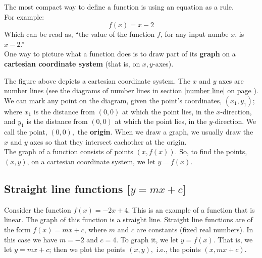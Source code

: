 \noindent The most compact way to define a function is using an equation as a rule. \\
For example:
\[
f(x) = x - 2
\]
Which can be read as, ``the value of the function $f$, for any input numbe $x$, is $x-2$.'' \\

\noindent One way to picture what a function does is to draw part of its \textbf{graph} on a \textbf{cartesian coordinate system} (that is, on $x,y$-axes).  \label{cartesian coordinate system} \label{graph}
\begin{center}
\end{center}
The figure above depicts a cartesian coordinate system. The $x$ and $y$ axes are number lines (see the diagrams of number lines in section \ref{number line} on page \pageref{number line}). We can mark any point on the diagram, given the point's coordinates, $(x_1,y_1)$; where $x_1$ is the distance from $(0,0)$ at which the point lies, in the $x$-direction, and $y_1$ is the distance from $(0,0)$ at which the point lies, in the $y$-direction. We call the point, $(0,0),$ the \textbf{origin}. When we draw a graph, we usually draw the $x$ and $y$ axes so that they intersect eachother at the origin. \\

\noindent The graph of a function consists of points $(x,f(x))$. So, to find the points, $(x,y)$, on a cartesian coordinate system, we let $y = f(x)$. 

\subsection{Straight line functions [$y = mx + c$]} \label{secline}
Consider the function $f(x) = -2x + 4$. This is an example of a function that is linear. The graph of this function is a straight line. Straight line functions are of the form $f(x) = mx + c$, where $m$ and $c$ are constants (fixed real numbers). In this case we have $m = -2$ and $c = 4$. To graph it, we let $y = f(x)$. That is, we let $y = mx+c$; then we plot the points $(x,y),$ i.e., the points $(x,mx+c).$ \\

